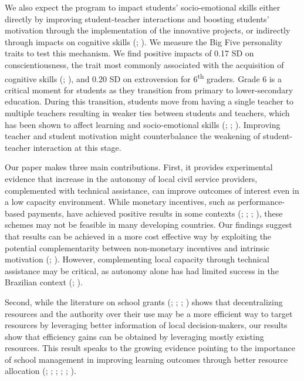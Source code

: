 \documentclass[11pt,a4paper]{article}
\begin{document}

We also expect the program to impact students' socio-emotional skills either directly by improving student-teacher interactions and boosting students' motivation through the implementation of the innovative projects, or indirectly through impacts on cognitive skills (\citealp{cunha2007technology,cunha2008formulating}; \citealp{cunha2010estimating}). We measure the Big Five personality traits to test this mechanism. We find positive impacts of 0.17 SD on conscientiousness, the trait most commonly associated with the acquisition of cognitive skills (\citealp{poropat2009meta}; \citealp{ivcevic2014predicting}), and 0.20 SD on extroversion for 6\textsuperscript{th} graders. Grade 6 is a critical moment for students as they transition from primary to lower-secondary education. During this transition, students move from having a single teacher to multiple teachers resulting in weaker ties between students and teachers, which has been shown to affect learning and socio-emotional skills (\citealp{bedard2005middle}; \citealp{hanewald2013transition}; \citealp{Santos2017}). Improving teacher and student motivation might counterbalance the weakening of student-teacher interaction at this stage.


Our paper makes three main contributions. First, it provides experimental evidence that increase in the autonomy of local civil service providers, complemented with technical assistance, can improve outcomes of interest even in a low capacity environment. While monetary incentives, such as performance-based payments, have achieved positive results in some contexts (\citealp{lavy2009performance}; \citealp{muralidharan2011teacher}; \citealp{duflo2012incentives}; \citealp{mbiti2019inputs}), these schemes may not be feasible in many developing countries. Our findings suggest that results can be achieved in a more cost effective way by exploiting the potential complementarity between non-monetary incentives and intrinsic motivation (\citealp{bowles2012economic}; \citealp{ashraf2014no}). However, complementing local capacity through technical assistance may be critical, as autonomy alone has had limited success in the Brazilian context (\citealp{almeida2016assessing}; \citealp{de2016impacto}).

Second, while the literature on school grants (\citealp{das2013school}; \citealp{blimpo2015parental}; \citealp{beasley2017willing}; \citealp{carneiro2020school}) shows that decentralizing resources and the authority over their use may be a more efficient way to target resources by leveraging better information of local decision-makers, our results show that efficiency gains can be obtained by leveraging mostly existing resources. This result speaks to the growing evidence pointing to the importance of school management in improving learning outcomes through better resource allocation (\citealp{abdulkadirouglu2011accountability}; \citealp{dobbie2013getting}; \citealp{rockoff2012information}; \citealp{taylor2012effect}; \citealp{fryer2014injecting}; \citealp{fryer2017management}).
\end{document}
